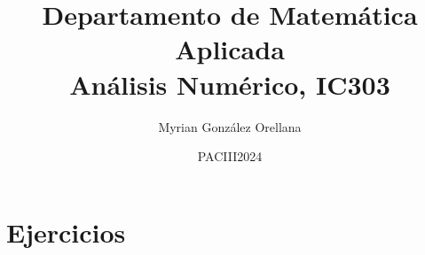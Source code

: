 \documentclass[10pt,legalpaper]{beamer}
\author{Myrian González Orellana}
\title{Departamento de Matemática Aplicada\\
Análisis Numérico, IC303}
\date{PACIII2024}
\begin{document}
\begin{frame}
\titlepage
\end{frame}

%
\section{Ejercicios}
%

\end{document}
